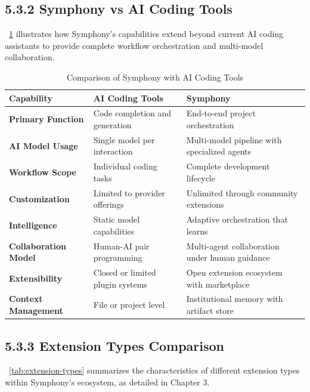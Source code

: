 \subsection*{5.3.2 Symphony vs AI Coding Tools}

~\ref{tab:ai-tools-comparison} illustrates how Symphony's capabilities extend beyond current AI coding assistants to provide complete workflow orchestration and multi-model collaboration.

\begin{table}[H]
\caption{Comparison of Symphony with AI Coding Tools}
\label{tab:ai-tools-comparison}
\centering
\small
\begin{tabular}{@{}p{3.5cm}p{5cm}p{5cm}@{}}
\toprule
\textbf{Capability} & \textbf{AI Coding Tools} & \textbf{Symphony} \\
\midrule
\textbf{Primary Function} & Code completion and generation & End-to-end project orchestration \\
\midrule
\textbf{AI Model Usage} & Single model per interaction & Multi-model pipeline with specialized agents \\
\midrule
\textbf{Workflow Scope} & Individual coding tasks & Complete development lifecycle \\
\midrule
\textbf{Customization} & Limited to provider offerings & Unlimited through community extensions \\
\midrule
\textbf{Intelligence} & Static model capabilities & Adaptive orchestration that learns \\
\midrule
\textbf{Collaboration Model} & Human-AI pair programming & Multi-agent collaboration under human guidance \\
\midrule
\textbf{Extensibility} & Closed or limited plugin systems & Open extension ecosystem with marketplace \\
\midrule
\textbf{Context Management} & File or project level & Institutional memory with artifact store \\
\bottomrule
\end{tabular}
\end{table}

\subsection*{5.3.3 Extension Types Comparison}

~\ref{tab:extension-types} summarizes the characteristics of different extension types within Symphony's ecosystem, as detailed in Chapter 3.

